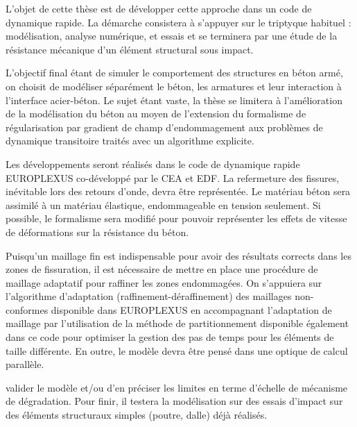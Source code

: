 L’objet de cette thèse est de développer cette approche dans un code de dynamique rapide. La
démarche consistera à s’appuyer sur le triptyque habituel : modélisation, analyse numérique, et
essais et se terminera par une étude de la résistance mécanique d’un élément structural sous impact.

L’objectif final étant de simuler le comportement des structures en béton armé, on choisit de
modéliser séparément le béton, les armatures et leur interaction à l’interface acier-béton. Le sujet
étant vaste, la thèse se limitera à l’amélioration de la modélisation du béton au moyen de l’extension
du formalisme de régularisation par gradient de champ d’endommagement aux problèmes de
dynamique transitoire traités avec un algorithme explicite. 

Les développements seront réalisés dans
le code de dynamique rapide EUROPLEXUS co-développé par le CEA et EDF. La refermeture des
fissures, inévitable lors des retours d’onde, devra être représentée. Le matériau béton sera assimilé à
un matériau élastique, endommageable en tension seulement. Si possible, le formalisme sera
modifié pour pouvoir représenter les effets de vitesse de déformations sur la résistance du béton.


Puisqu’un maillage fin est indispensable pour avoir des résultats corrects dans les zones de
fissuration, il est nécessaire de mettre en place une procédure de maillage adaptatif pour raffiner les
zones endommagées. On s’appuiera sur l’algorithme d’adaptation (raffinement-déraffinement) des
maillages non-conformes disponible dans EUROPLEXUS en accompagnant l'adaptation de maillage
par l'utilisation de la méthode de partitionnement disponible également dans ce code pour optimiser
la gestion des pas de temps pour les éléments de taille différente. En outre, le modèle devra être
pensé dans une optique de calcul parallèle.

valider le modèle et/ou
d’en préciser les limites en terme d’échelle de mécanisme de dégradation.
Pour finir, il testera la modélisation sur des essais d’impact sur des éléments structuraux simples
(poutre, dalle) déjà réalisés.




